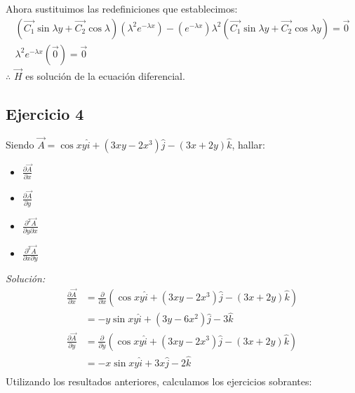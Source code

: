 \documentclass[12pt,openany]{book}
\begin{document}
				Ahora sustituimos las redefiniciones que establecimos:
				\begin{equation*}
					\begin{split}
						\left(\vec{C_{1}}\sin\lambda y + \vec{C_{2}}\cos\lambda\right)\left(\lambda^{2} e^{-\lambda x}\right)
							-(e^{-\lambda x})\lambda^{2}\left(\vec{C_{1}}\sin\lambda y+\vec{C_{2}}\cos\lambda y\right)=\vec{0}	\\
						\lambda^{2} e^{-\lambda x}(\vec{0})=\vec{0}
					\end{split}
				\end{equation*}
				$\therefore$ $\vec{H}$ es soluci\'on de la ecuaci\'on diferencial.

			\subsection{Ejercicio 4}
				Siendo $\vec{A}=\cos xy\hat{i}+(3xy-2x^{3})\hat{j}-(3x+2y)\hat{k}$, hallar:\\
				\begin{multicols}{4}
					\begin{itemize}
						\item $\frac{\partial \vec{A}}{\partial x}$
				\breakcolumn
						\item $\frac{\partial \vec{A}}{\partial y}$
		 		\breakcolumn
		 				\item $\frac{\partial^{2} \vec{A}}{\partial y\partial x}$
		 		\breakcolumn
		 				\item $\frac{\partial^{2} \vec{A}}{\partial x\partial y}$
					\end{itemize}
				\end{multicols}
				\noindent \textsl{Soluci\'on:}
				\begin{equation*}
					\begin{split}
						\frac{\partial \vec{A}}{\partial x}&=\frac{\partial}{\partial x}
															\left(\cos xy\hat{i}+(3xy-2x^{3})\hat{j}-(3x+2y)\hat{k}\right)	\\
														   &=-y\sin xy\hat{i}+(3y-6x^{2})\hat{j}-3\hat{k}					\\
						\frac{\partial \vec{A}}{\partial y}&=\frac{\partial}{\partial y}
															\left(\cos xy\hat{i}+(3xy-2x^{3})\hat{j}-(3x+2y)\hat{k}\right)	\\
														   &=-x\sin xy\hat{i}+3x\hat{j}-2\hat{k}							\\
					\end{split}
				\end{equation*}
				Utilizando los resultados anteriores, calculamos los ejercicios sobrantes:				
\end{document}
